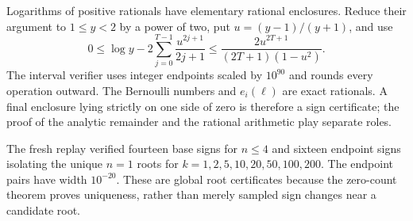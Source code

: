 Logarithms of positive rationals have elementary rational enclosures.
Reduce their argument to $1\le y<2$ by a power of two, put
$u=(y-1)/(y+1)$, and use
\[
0\le\log y-2\sum_{j=0}^{T-1}\frac{u^{2j+1}}{2j+1}
\le\frac{2u^{2T+1}}{(2T+1)(1-u^2)}.
\]
The interval verifier uses integer endpoints scaled by $10^{90}$ and
rounds every operation outward. The Bernoulli numbers and $e_i(\ell)$
are exact rationals. A final enclosure lying strictly on one side of
zero is therefore a sign certificate; the proof of the analytic remainder
and the rational arithmetic play separate roles.

The fresh replay verified fourteen base signs for $n\le4$ and sixteen
endpoint signs isolating the unique $n=1$ roots for
$k=1,2,5,10,20,50,100,200$. The endpoint pairs have width $10^{-20}$.
These are global root certificates because the zero-count theorem proves
uniqueness, rather than merely sampled sign changes near a candidate root.
